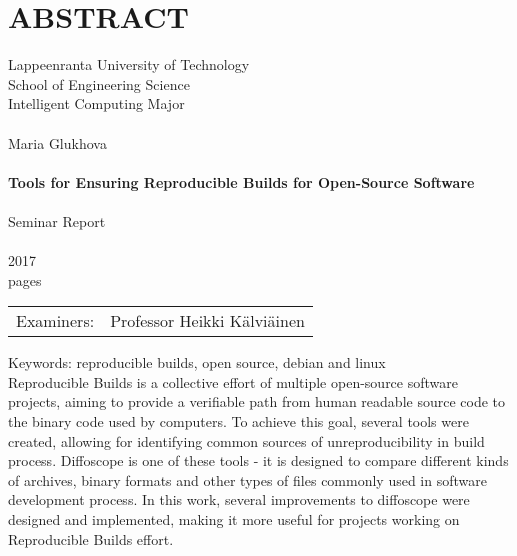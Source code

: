 \section*{ABSTRACT}

Lappeenranta University of Technology\\
School of Engineering Science\\
Intelligent Computing Major\\
\\

Maria Glukhova\\
\\
\textbf{Tools for Ensuring Reproducible Builds for Open-Source Software}\\
\\
Seminar Report\\
\\
2017\\
\pageref{LastPage} pages\\


\begin{tabular}{l p{11.0cm}}  
  
Examiners: & Professor \foreignlanguage{finnish}{Heikki Kälviäinen}

\end {tabular}

Keywords: reproducible builds, open source, debian and linux\\


Reproducible Builds is a collective effort of multiple open-source software
projects, aiming to provide a verifiable path from human readable source code
to the binary code used by computers. To achieve this goal, several tools were
created, allowing for identifying common sources of unreproducibility in build
process.
Diffoscope is one of these tools - it is designed to compare different kinds of
archives, binary formats and other types of files commonly used in software
development process. In this work, several improvements to diffoscope were
designed and implemented, making it more useful for projects working on
Reproducible Builds effort.\\

